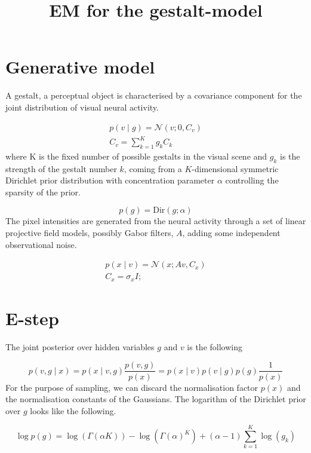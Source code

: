 \documentclass{paper}
\begin{document}
\title{EM for the gestalt-model}
\maketitle

\section{Generative model}

A gestalt, a perceptual object is characterised by a covariance component for the joint distribution of visual neural activity. 

\begin{eqnarray}
p(v \mid g) = \mathcal{N}(v; 0,C_v) \\
C_v = \sum_{k=1}^K g_k C_k \label{eq:cv}
\end{eqnarray}
%
where K is the fixed number of possible gestalts in the visual scene and $g_k$ is the strength of the gestalt number $k$, coming from a $K$-dimensional symmetric Dirichlet prior distribution with concentration parameter $\alpha$ controlling the sparsity of the prior.

\begin{equation}
p(g) = \textrm{Dir}(g; \alpha)
\end{equation}
%
The pixel intensities are generated from the neural activity through a set of linear projective field models, possibly Gabor filters, $A$, adding some independent observational noise.

\begin{eqnarray}
p(x \mid v) = \mathcal{N}(x; Av,C_x) \\
C_x = \sigma_x I;
\end{eqnarray}

\section{E-step}

The joint posterior over hidden variables $g$ and $v$ is the following

\begin{equation}
p(v,g \mid x) = p(x \mid v,g) \frac{p(v,g)}{p(x)} = p(x \mid v) p(v \mid g) p(g)\frac{1}{p(x)}
\end{equation}
%
For the purpose of sampling, we can discard the normalisation factor $p(x)$ and the normalisation constants of the Gaussians. The logarithm of the Dirichlet prior over $g$ looks like the following. 

\begin{equation}
\log p(g) = \log(\Gamma(\alpha K)) - \log(\Gamma(\alpha)^K) + (\alpha-1) \sum_{k=1}^K \log(g_k)
\end{equation}
\end{document}
